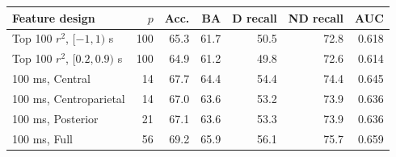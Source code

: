 \begin{tabular}{@{}lrrrrrr@{}}
\toprule
Feature design & $p$ & Acc. & BA & D recall & ND recall & AUC \\
\midrule
Top 100 $r^2$, $[-1,1)$ s & 100 & 65.3 & 61.7 & 50.5 & 72.8 & 0.618 \\
Top 100 $r^2$, $[0.2,0.9)$ s & 100 & 64.9 & 61.2 & 49.8 & 72.6 & 0.614 \\
100 ms, Central & 14 & 67.7 & 64.4 & 54.4 & 74.4 & 0.645 \\
100 ms, Centroparietal & 14 & 67.0 & 63.6 & 53.2 & 73.9 & 0.636 \\
100 ms, Posterior & 21 & 67.1 & 63.6 & 53.3 & 73.9 & 0.636 \\
100 ms, Full & 56 & 69.2 & 65.9 & 56.1 & 75.7 & 0.659 \\
\bottomrule
\end{tabular}

